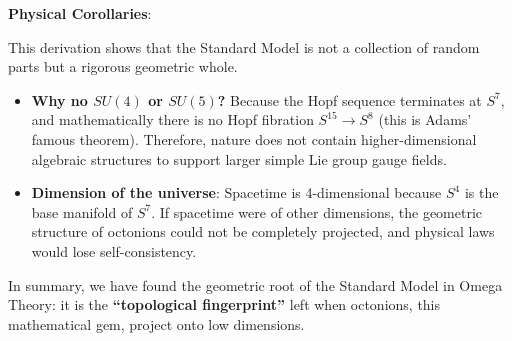 \textbf{Physical Corollaries}:

This derivation shows that the Standard Model is not a collection of random parts but a rigorous geometric whole.

\begin{itemize}
\item \textbf{Why no $SU(4)$ or $SU(5)$?} Because the Hopf sequence terminates at $S^7$, and mathematically there is no Hopf fibration $S^{15} \to S^8$ (this is Adams' famous theorem). Therefore, nature does not contain higher-dimensional algebraic structures to support larger simple Lie group gauge fields.
\item \textbf{Dimension of the universe}: Spacetime is 4-dimensional because $S^4$ is the base manifold of $S^7$. If spacetime were of other dimensions, the geometric structure of octonions could not be completely projected, and physical laws would lose self-consistency.
\end{itemize}

In summary, we have found the geometric root of the Standard Model in Omega Theory: it is the \textbf{``topological fingerprint''} left when octonions, this mathematical gem, project onto low dimensions.
